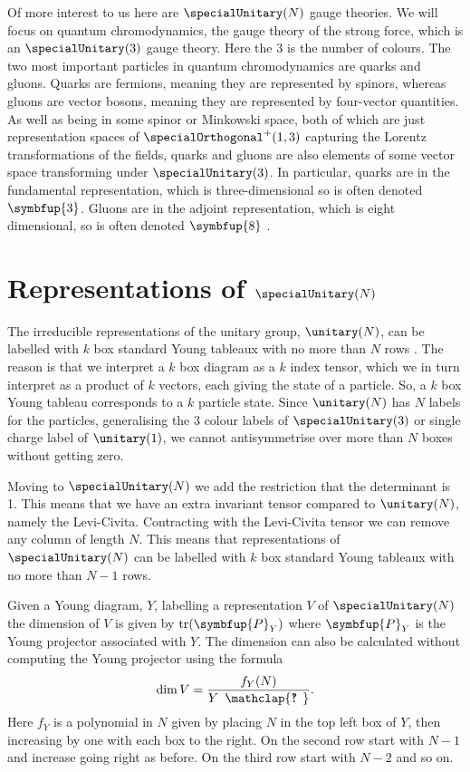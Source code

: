 \documentclass[fleqn]{NotesClass}
\newcommand{\projector}[1]{\symbfup{P}_{#1}}
\newcommand{\hooknumber}[1]{#1{\phantom{?}\mkern1mu\mathclap{\ooalign{\hfil ? \hfil \cr \hfil ! \hfil}}}}
\DeclareMathOperator{\tr}{tr}
\newcommand{\rep}[1]{\symbfup{#1}}
\begin{document}
    Of more interest to us here are \(\specialUnitary(N)\) gauge theories.
    We will focus on quantum chromodynamics, the gauge theory of the strong force, which is an \(\specialUnitary(3)\) gauge theory.
    Here the 3 is the number of colours.
    The two most important particles in quantum chromodynamics are quarks and gluons.
    Quarks are fermions, meaning they are represented by spinors, whereas gluons are vector bosons, meaning they are represented by four-vector quantities.
    As well as being in some spinor or Minkowski space, both of which are just representation spaces of \(\specialOrthogonal^+(1, 3)\) capturing the Lorentz transformations of the fields, quarks and gluons are also elements of some vector space transforming under \(\specialUnitary(3)\).
    In particular, quarks are in the fundamental representation, which is three-dimensional so is often denoted \(\rep{3}\).
    Gluons are in the adjoint representation, which is eight dimensional, so is often denoted \(\rep{8}\) \cite{peskin}.
    
    \section{Representations of \texorpdfstring{\(\specialUnitary(N)\)}{SU(N)}}
    The irreducible representations of the unitary group, \(\unitary(N)\), can be labelled with \(k\) box standard Young tableaux with no more than \(N\) rows \cite[87]{cvitanovic}.
    The reason is that we interpret a \(k\) box diagram as a \(k\) index tensor, which we in turn interpret as a product of \(k\) vectors, each giving the state of a particle.
    So, a \(k\) box Young tableau corresponds to a \(k\) particle state.
    Since \(\unitary(N)\) has \(N\) labels for the particles, generalising the 3 colour labels of \(\specialUnitary(3)\) or single charge label of \(\unitary(1)\), we cannot antisymmetrise over more than \(N\) boxes without getting zero.
    
    Moving to \(\specialUnitary(N)\) we add the restriction that the determinant is 1.
    This means that we have an extra invariant tensor compared to \(\unitary(N)\), namely the Levi-Civita.
    Contracting with the Levi-Civita tensor we can remove any column of length \(N\).
    This means that representations of \(\specialUnitary(N)\) can be labelled with \(k\) box standard Young tableaux with no more than \(N - 1\) rows.
    
    Given a Young diagram, \(Y\), labelling a representation \(V\) of \(\specialUnitary(N)\) the dimension of \(V\) is given by \(\tr(\projector{Y})\) where \(\projector{Y}\) is the Young projector associated with \(Y\).
    The dimension can also be calculated without computing the Young projector using the formula
    \begin{equation}\label{eqn:dim of SU N rep}
        \dim V = \frac{f_Y(N)}{\hooknumber{Y}}.
    \end{equation}
    Here \(f_Y\) is a polynomial in \(N\) given by placing \(N\) in the top left box of \(Y\), then increasing by one with each box to the right.
    On the second row start with \(N - 1\) and increase going right as before.
    On the third row start with \(N - 2\) and so on.
    
\end{document}
